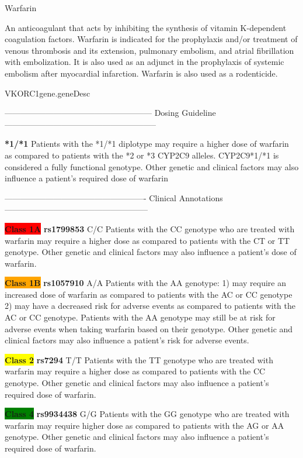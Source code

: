 \documentclass{resume} %
\begin{document}
\begin{rSection}{Warfarin}
\item An anticoagulant that acts by inhibiting the synthesis of vitamin K-dependent coagulation factors. Warfarin is indicated for the prophylaxis and/or treatment of venous thrombosis and its extension, pulmonary embolism, and atrial fibrillation with embolization. It is also used as an adjunct in the prophylaxis of systemic embolism after myocardial infarction. Warfarin is also used as a rodenticide.

\begin{rSubsection}{VKORC1}{gene.geneDesc}{}{}
\item[]------------------------------------------------------ Dosing Guideline --------------------------------------------------------
\item \textbf{*1/*1} \newline Patients with the *1/*1 diplotype may require a higher dose of warfarin as compared to patients with the *2 or *3 CYP2C9 alleles. CYP2C9*1/*1 is considered a fully functional genotype. Other genetic and clinical factors may also influence a patient's required dose of warfarin 
\item[] ---------------------------------------------------- Clinical Annotations -----------------------------------------------------
\item \textbf{\colorbox{red}{Class 1A}} \textbf{rs1799853}  C/C \newline Patients with the CC genotype who are treated with warfarin may require a higher dose as compared to patients with the CT or TT genotype. Other genetic and clinical factors may also influence a patient's dose of warfarin.
\item  \textbf{\colorbox{orange}{Class 1B}} \textbf{rs1057910} A/A \newline Patients with the AA genotype: 1) may require an increased dose of warfarin as compared to patients with the AC or CC genotype 2) may have a decreased risk for adverse events as compared to patients with the AC or CC genotype. Patients with the AA genotype may still be at risk for adverse events when taking warfarin based on their genotype. Other genetic and clinical factors may also influence a patient's risk for adverse events.
\item  \textbf{\colorbox{yellow}{Class 2}} \textbf{rs7294} T/T \newline Patients with the TT genotype who are treated with warfarin may require a higher dose as compared to patients with the CC genotype. Other genetic and clinical factors may also influence a patient's required dose of warfarin.
\item  \textbf{\colorbox{green}{Class 4}} \textbf{rs9934438} G/G \newline Patients with the GG genotype who are treated with warfarin may require higher dose as compared to patients with the AG or AA genotype. Other genetic and clinical factors may also influence a patient's required dose of warfarin.
\end{rSubsection}

\end{rSection}
\end{document}

